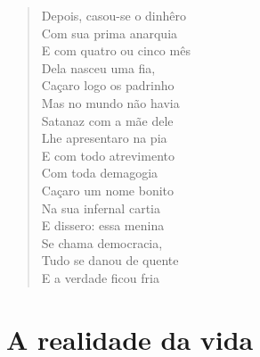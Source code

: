 \begin{verse}
Depois, casou-se o dinhêro\\
Com sua prima anarquia\\
E com quatro ou cinco mês\\
Dela nasceu uma fia,\\
Caçaro logo os padrinho\\
Mas no mundo não havia\\
Satanaz com a mãe dele\\
Lhe apresentaro na pia\\
E com todo atrevimento\\
Com toda demagogia\\
Caçaro um nome bonito\\
Na sua infernal cartia\\
E dissero: essa menina\\
Se chama democracia,\\
Tudo se danou de quente\\
E a verdade ficou fria
\end{verse}

\chapter{A realidade da vida}

